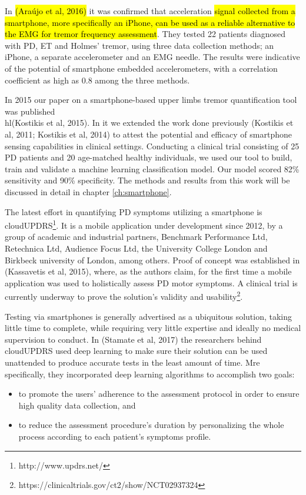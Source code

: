 In \hl{(Araújo et al, 2016)} it was confirmed that acceleration \hl{signal collected from a smartphone, more specifically an iPhone, can be used as a reliable alternative to the EMG for tremor frequency assessment}. They tested 22 patients diagnosed with \gls{PD}, \gls{ET} and Holmes' tremor, using three data collection methods; an iPhone, a separate accelerometer and an \gls{EMG} needle. The results were indicative of the potential of smartphone embedded accelerometers, with a correlation coefficient as high as 0.8 among the three methods. 

In 2015 our paper on a smartphone-based upper limbs tremor quantification tool was published \\hl{(Kostikis et al, 2015)}. In it we extended the work done previously (Kostikis et al, 2011; Kostikis et al, 2014) to attest the potential and efficacy of smartphone sensing capabilities in clinical settings. Conducting a clinical trial consisting of 25 \gls{PD} patients and 20 age-matched healthy individuals, we used our tool to build, train and validate a machine learning classification model. Our model scored 82\% sensitivity and 90\% specificity. The methods and results from this work will be discussed in detail in chapter \ref{ch:smartphone}. 

The latest effort in quantifying \gls{PD} symptoms utilizing a smartphone is cloudUPDRS\footnote{http://www.updrs.net/}. It is a mobile application under development since 2012, by a group of academic and industrial partners, Benchmark Performance Ltd, Retechnica Ltd, Audience Focus Ltd, the University College London and Birkbeck university of London, among others. Proof of concept was established in (Kassavetis et al, 2015), where, as the authors claim, for the first time a mobile application was used to holistically assess \gls{PD} motor symptoms. A clinical trial is currently underway to prove the solution's validity and usability\footnote{https://clinicaltrials.gov/ct2/show/NCT02937324}. 

Testing via smartphones is generally advertised as a ubiquitous solution, taking little time to complete, while requiring very little expertise and ideally no medical supervision to conduct. 
In (Stamate et al, 2017) the researchers behind cloudUPDRS used deep learning to make sure their solution can be used unattended to produce accurate tests in the least amount of time. Mre specifically, they incorporated deep learning algorithms to accomplish two goals: 

\begin{itemize}
\item to promote the users' adherence to the assessment protocol in order to ensure high quality data collection, and
\item to reduce the assessment procedure's duration by personalizing the whole process according to each patient's symptoms profile. 
\end{itemize}

